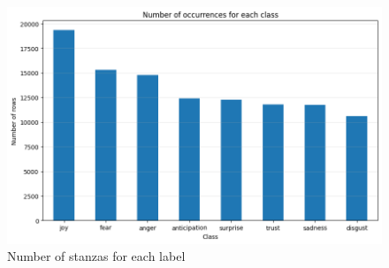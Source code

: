 
\begin{figure}[H]
    \centering
    \includegraphics[width=0.7\linewidth]{pictures/exploratory_graph.png}
    \caption{Number of stanzas for each label}
    \label{fig:enter-label}
\end{figure}

